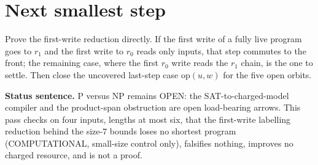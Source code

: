 \documentclass[11pt]{article}
\begin{document}
\section*{Next smallest step}
Prove the first-write reduction directly. If the first write of a fully live program goes to $r_1$ and the first write to $r_0$ reads only inputs, that step commutes to the front; the remaining case, where the first $r_0$ write reads the $r_1$ chain, is the one to settle. Then close the uncovered last-step case $\mathrm{op}(u,w)$ for the five open orbits.

\bigskip
\noindent\textbf{Status sentence.} P versus NP remains OPEN: the SAT-to-charged-model compiler and the product-span obstruction are open load-bearing arrows. This pass checks on four inputs, lengths at most six, that the first-write labelling reduction behind the size-$7$ bounds loses no shortest program (COMPUTATIONAL, small-size control only), falsifies nothing, improves no charged resource, and is not a proof.
\end{document}
